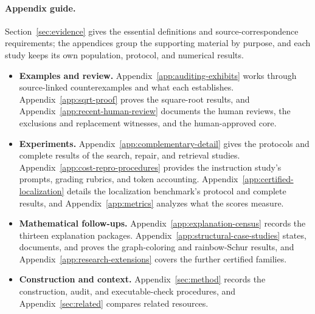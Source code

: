 \paragraph{Appendix guide.}
Section~\ref{sec:evidence} gives the essential definitions and source-correspondence requirements; the appendices group the supporting material by purpose, and each study keeps its own population, protocol, and numerical results.
\begin{itemize}[leftmargin=*,itemsep=2pt,topsep=3pt]
\item \textbf{Examples and review.} Appendix~\ref{app:auditing-exhibits} works through source-linked counterexamples and what each establishes. Appendix~\ref{app:sqrt-proof} proves the square-root results, and Appendix~\ref{app:recent-human-review} documents the human reviews, the exclusions and replacement witnesses, and the human-approved core.
\item \textbf{Experiments.} Appendix~\ref{app:complementary-detail} gives the protocols and complete results of the search, repair, and retrieval studies. Appendix~\ref{app:cost-repro-procedures} provides the instruction study's prompts, grading rubrics, and token accounting. Appendix~\ref{app:certified-localization} details the localization benchmark's protocol and complete results, and Appendix~\ref{app:metrics} analyzes what the scores measure.
\item \textbf{Mathematical follow-ups.} Appendix~\ref{app:explanation-census} records the thirteen explanation packages. Appendix~\ref{app:structural-case-studies} states, documents, and proves the graph-coloring and rainbow-Schur results, and Appendix~\ref{app:research-extensions} covers the further certified families.
\item \textbf{Construction and context.} Appendix~\ref{sec:method} records the construction, audit, and executable-check procedures, and Appendix~\ref{sec:related} compares related resources.
\end{itemize}

\FloatBarrier

\FloatBarrier

\FloatBarrier


\FloatBarrier

\FloatBarrier

\FloatBarrier

\FloatBarrier

\FloatBarrier

\FloatBarrier

\FloatBarrier

\FloatBarrier


\FloatBarrier

